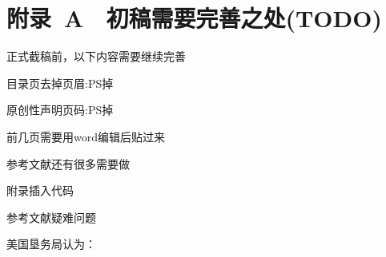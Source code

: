 ﻿%

\chapter*{\hfill 附录~A　初稿需要完善之处(TODO) \hfill}

正式截稿前，以下内容需要继续完善

\begin{asparaenum}
\item 目录页去掉页眉:PS掉
\item 原创性声明页码:PS掉
\item 前几页需要用word编辑后贴过来
\item 参考文献还有很多需要做
\item 附录插入代码
\end{asparaenum}

参考文献疑难问题
\begin{asparaenum}
\item 美国垦务局认为：
\item
\end{asparaenum}
